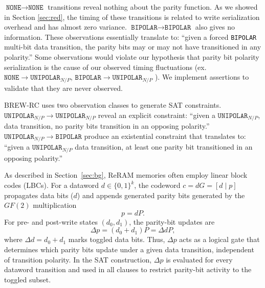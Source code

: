 $\texttt{NONE}\rightarrow\texttt{NONE}$ transitions reveal nothing about the parity function. As we showed in Section \ref{sec:red}, the timing of these transitions is related to write serialization overhead and has almost zero variance. 
$\texttt{BIPOLAR}\rightarrow\texttt{BIPOLAR}$ also gives no information. These observations essentially translate to: ``given a forced \texttt{BIPOLAR} multi-bit data transition, the parity bits may or may not have transitioned in any polarity.''
Some observations would violate our hypothesis that parity bit polarity serialization is the cause of our observed timing fluctuations (ex. $\texttt{NONE} \to \texttt{UNIPOLAR}_{N/P}$,  $\texttt{BIPOLAR}\rightarrow\texttt{UNIPOLAR}_{N/P}$ ). We implement assertions to validate that they are never observed.

BREW-RC uses two observation classes to generate SAT constraints.
$\texttt{UNIPOLAR}_{N/P}\rightarrow\texttt{UNIPOLAR}_{N/P}$ reveal an explicit constraint: ``given a $\texttt{UNIPOLAR}_{N/P}$, data transition, no parity bits transition in an opposing polarity.'' $\texttt{UNIPOLAR}_{N/P}\rightarrow\texttt{BIPOLAR}$ produce an existential constraint that translates to: ``given a $\texttt{UNIPOLAR}_{N/P}$ data transition, at least one parity bit transitioned in an opposing polarity.''

As described in Section~\ref{sec:bg}, ReRAM memories often employ linear block codes (LBCs). For a dataword $d\in\{0,1\}^k$, the codeword $c=dG=[d\mid p]$ propagates data bits ($d$) and appends generated parity bits generated by the $GF(2)$ multiplication
{
\setlength{\abovedisplayskip}{1pt}
\setlength{\belowdisplayskip}{1pt}
\begin{equation}
    p = dP.
\end{equation}
}
For pre- and post-write states $(d_0,d_1)$, the parity-bit updates are
{
\setlength{\abovedisplayskip}{1pt}
\setlength{\belowdisplayskip}{1pt}
\begin{equation}
    \Delta p = (d_0 + d_1)P = \Delta d P,
\end{equation}
}
where $\Delta d=d_0+d_1$ marks toggled data bits.  
Thus, $\Delta p$ acts as a logical gate that determines which parity bits update under a given data transition, independent of transition polarity.  
In the SAT construction, $\Delta p$ is evaluated for every dataword transition and used in all clauses to restrict parity-bit activity to the toggled subset.


